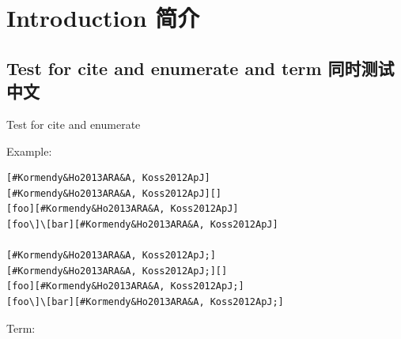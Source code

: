 











\section{Introduction 简介}
\label{sec:intro}

\subsection{Test for cite and enumerate and term 同时测试中文}
\label{sec:cite}

Test for cite and enumerate %





Example:

\begin{verbatim}
[#Kormendy&Ho2013ARA&A, Koss2012ApJ]
[#Kormendy&Ho2013ARA&A, Koss2012ApJ][]
[foo][#Kormendy&Ho2013ARA&A, Koss2012ApJ]
[foo\]\[bar][#Kormendy&Ho2013ARA&A, Koss2012ApJ]

[#Kormendy&Ho2013ARA&A, Koss2012ApJ;]
[#Kormendy&Ho2013ARA&A, Koss2012ApJ;][]
[foo][#Kormendy&Ho2013ARA&A, Koss2012ApJ;]
[foo\]\[bar][#Kormendy&Ho2013ARA&A, Koss2012ApJ;]
\end{verbatim}

Term:

